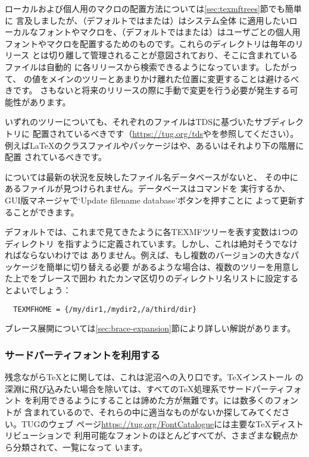 \documentclass[uplatex,dvipdfmx]{jsarticle}
\begin{document}
ローカルおよび個人用のマクロの配置方法については\ref{sec:texmftrees}節でも簡単に
言及しましたが、（デフォルトではまたは）はシステム全体
に適用したいローカルなフォントやマクロを、（デフォルトではまたは）はユーザごとの個人用
フォントやマクロを配置するためのものです。これらのディレクトリは毎年のリリース
とは切り離して管理されることが意図されており、そこに含まれているファイルは自動的
に各\TL リリースから検索できるようになっています。したがって、%
の値をメインの\TL ツリーとあまりかけ離れた位置に変更することは避けるべきです。
さもないと将来のリリースの際に手動で変更を行う必要が発生する可能性があります。

いずれのツリーについても、それぞれのファイルはTDSに基づいたサブディレクトリに
配置されているべきです（\url{https://tug.org/tds}やを参照してください）。例えば\LaTeX のクラスファイルやパッケージはや、あるいはそれより下の階層に配置
されているべきです。

については最新の状況を反映したファイル名データベースがないと、
その中にあるファイルが見つけられません。データベースはコマンドを
実行するか、GUI版\TL マネージャで`Update filename database'ボタンを押すことに
よって更新することができます。

デフォルトでは、これまで見てきたように各TEXMFツリーを表す変数は1つのディレクトリ
を指すように定義されています。しかし、これは絶対そうでなければならないわけでは
ありません。例えば、もし複数のバージョンの大きなパッケージを簡単に切り替える必要
があるような場合は、複数のツリーを用意した上でをブレースで囲わ
れたカンマ区切りのディレクトリ名リストに設定するとよいでしょう：
%
\begin{verbatim}
  TEXMFHOME = {/my/dir1,/mydir2,/a/third/dir}
\end{verbatim}
%
ブレース展開については\ref{sec:brace-expansion}節により詳しい解説があります。

\subsubsection{サードパーティフォントを利用する}

残念ながら\TeX と\pdfTeX に関しては、これは泥沼への入り口です。\TeX インストール
の深淵に飛び込みたい場合を除いては、すべての\TeX 処理系でサードパーティフォント
を利用できるようにすることは諦めた方が無難です。\TL には数多くのフォントが
含まれているので、それらの中に適当なものがないか探してみてください。TUGのウェブ
ページ\url{https://tug.org/FontCatalogue}には主要な\TeX ディストリビューションで
利用可能なフォントのほとんどすべてが、さまざまな観点から分類されて、一覧になって
います。
\end{document}

